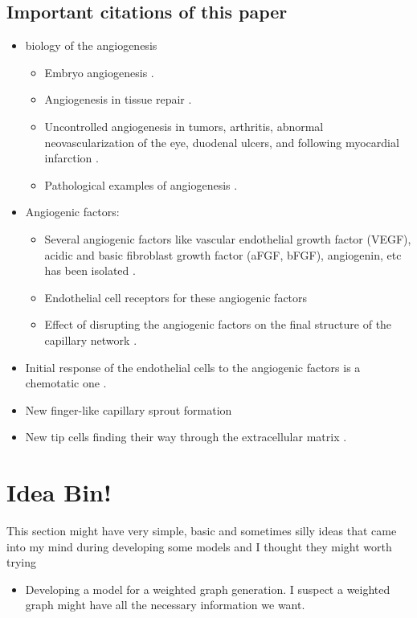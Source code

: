 \subsection{Important citations of this paper}
\begin{itemize}[noitemsep]
	\item biology of the angiogenesis
	\begin{itemize}[noitemsep]
		\item Embryo angiogenesis \cite{Graham1992}.
		\item Angiogenesis in tissue repair \cite{Arnold1991,Pettet1996}.
		\item Uncontrolled angiogenesis in tumors, arthritis, abnormal neovascularization of the eye, duodenal ulcers, and following myocardial infarction \cite{Folkman1985,Folkman1995,Folkman1987}.
		\item Pathological examples of angiogenesis \cite{Muthukkaruppan1982,Ribatti2008}.
	\end{itemize}
	\item Angiogenic factors:
	\begin{itemize}
		\item Several angiogenic factors like vascular endothelial growth factor (VEGF), acidic and basic fibroblast growth factor (aFGF, bFGF), angiogenin, etc has been isolated \cite{Folkman1987,Relf1997}.
		\item Endothelial cell receptors for these angiogenic factors \cite{Millauer1993,Hatva1995,Mandriota1995,Fong1995,Hewett1996,Patterson1996,Kappel1999,0deab5d12daa4d32b398e5c5f589f651,Hanahan1997}
		\item Effect of disrupting the angiogenic factors on the final structure of the capillary network \cite{Dumont1994,Fong1995,Sato1995,Hanahan1997}.
	\end{itemize}
	\item Initial response of the endothelial cells to the angiogenic factors is a chemotatic one \cite{Sholley1984,Terranova1985,Paweletz1989,Stokes1990}.
	\item New finger-like capillary sprout formation \cite{Cliff1963,Warren1966,Ausprunk1977,Sholley1984}
	\item New tip cells finding their way through the extracellular matrix \cite{Liotta1983,Paweletz1989}.
\end{itemize}


\newpage
\section{Idea Bin!}
This section might have very simple, basic and sometimes silly ideas that came into my mind during developing some models and I thought they might worth trying
\begin{itemize}
	\item Developing a model for a weighted graph generation. I suspect a weighted graph might have all the necessary information we want.
\end{itemize}

